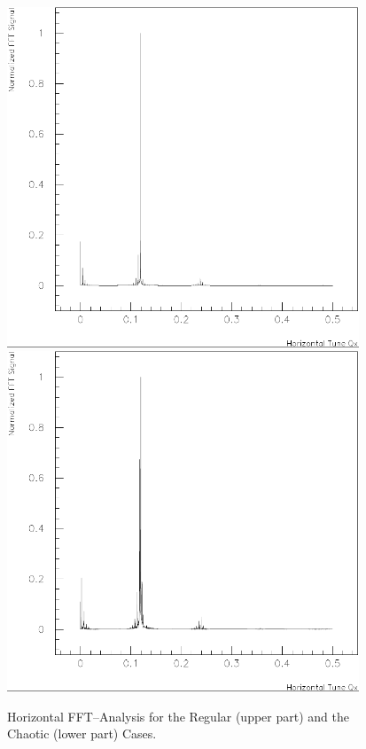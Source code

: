 \documentclass[a4paper,11pt]{report}
\begin{document}
\begin{figure}[H]
\begin{center}
  \mbox{\includegraphics*[width=10.5cm]{exp7}}
  \\[5mm]
  \mbox{\includegraphics*[width=10.5cm]{exp15}}
 \caption{Horizontal FFT--Analysis for the Regular (upper part)
   and the Chaotic (lower part) Cases.}
 \label{P-FFT}
\end{center}
\end{figure}
\end{document}
